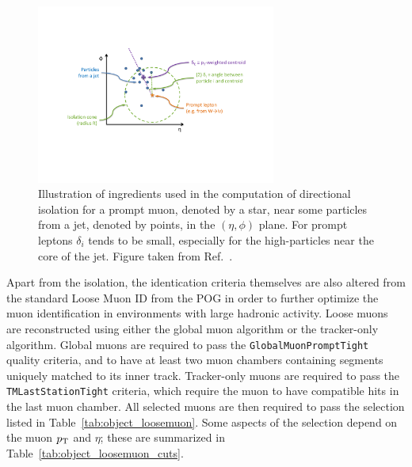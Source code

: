 \begin{figure}[htpb]
  \centering
  \includegraphics[width=0.7\textwidth]{figures/eventreco_objects/directional_iso_cartoon}
  \caption{Illustration of ingredients used in the computation of directional isolation for a prompt
muon, denoted by a star, near some particles from a jet, denoted by points, in the $(\eta,\phi)$
plane. For prompt leptons $\delta_i$ tends to be small, especially for the high-\pt particles near
the core of the jet. Figure taken from Ref.~\cite{CMS-AN2011-498}.
  \label{fig:object_directional_iso}}
\end{figure}

Apart from the isolation, the identication criteria themselves are also altered from the standard
Loose Muon ID from the POG in order to further optimize the muon identification in environments
with large hadronic activity. 
Loose muons are reconstructed using either the global muon algorithm or the tracker-only
algorithm. 
Global muons are required to pass the {\tt GlobalMuonPromptTight} quality criteria,
and to have at least two muon chambers containing segments uniquely matched to its inner track. 
Tracker-only muons are required to pass the {\tt TMLastStationTight} criteria, which require the
muon to have compatible hits in the last muon chamber. 
All selected muons are then required to pass the selection listed in
Table~\ref{tab:object_loosemuon}. 
Some aspects of the selection depend on the muon $p_{\mathrm{T}}$ and $\eta$; these are summarized in
Table~\ref{tab:object_loosemuon_cuts}.

